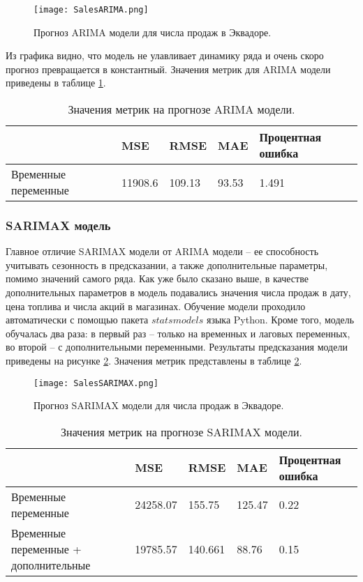 \documentclass[]{article}
\begin{document}
\begin{figure}[h!]
	\centering
	\texttt{[image: SalesARIMA.png]}
	\caption{Прогноз ARIMA модели для числа продаж в Эквадоре.}
	\label{fig:arima}
\end{figure}

Из графика видно, что модель не улавливает динамику ряда и очень скоро прогноз превращается в константный. Значения метрик для ARIMA модели приведены в таблице \ref{tab:arima}.

\begin{table}[h!]
	\centering
	\caption{Значения метрик на прогнозе ARIMA модели.}
	\begin{tabularx}{\textwidth}{|X|l|l|l|l|}
		\hline
								& MSE       & RMSE   & MAE   & Процентная ошибка \\ \hline
		{Временные переменные}  & 11908.6   & 109.13 & 93.53 & 1.491             \\ \hline
	\end{tabularx}
	\label{tab:arima}
\end{table}



\subsubsection{SARIMAX модель}

Главное отличие SARIMAX модели от ARIMA модели -- ее способность учитывать сезонность в предсказании, а также дополнительные параметры, помимо значений самого ряда. Как уже было сказано выше, в качестве дополнительных параметров в модель подавались значения числа продаж в дату, цена топлива и числа акций в магазинах. Обучение модели проходило автоматически с помощью пакета $statsmodels$ языка Python. Кроме того, модель обучалась два раза: в первый раз -- только на временных и лаговых переменных, во второй -- с дополнительными переменными.
Результаты предсказания модели приведены на рисунке \ref{fig:sarimax}. Значения метрик представлены в таблице  \ref{tab:sarimax}.

\begin{figure}[h!]
	\centering
	\texttt{[image: SalesSARIMAX.png]}
	\caption{Прогноз SARIMAX модели для числа продаж в Эквадоре.}
	\label{fig:sarimax}
\end{figure}

\begin{table}[h!]
	\centering
	\caption{Значения метрик на прогнозе SARIMAX модели.}
	\begin{tabularx}{\textwidth}{|X|l|l|l|l|}
		\hline
		& MSE          & RMSE   & MAE   & Процентная ошибка \\ \hline
		{Временные переменные}                  & 24258.07 & 155.75 & 125.47 & 0.22\\ \hline
		{Временные переменные + дополнительные} & 19785.57 & 140.661   & 88.76 & 0.15 \\ \hline
	\end{tabularx}
	\label{tab:sarimax}
\end{table}
\end{document}
